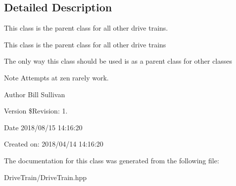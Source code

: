 \subsection{Detailed Description}
This class is the parent class for all other drive trains. 

This class is the parent class for all other drive trains

The only way this class should be used is as a parent class for other classes

\begin{DoxyNote}{Note}
Attempts at zen rarely work.
\end{DoxyNote}
\begin{DoxyAuthor}{Author}
Bill Sullivan
\end{DoxyAuthor}
\begin{DoxyVersion}{Version}
\$\+Revision\+: 1.
\end{DoxyVersion}
\begin{DoxyDate}{Date}
2018/08/15 14\+:16\+:20
\end{DoxyDate}
Created on\+: 2018/04/14 14\+:16\+:20 

The documentation for this class was generated from the following file\+:\begin{DoxyCompactItemize}
\item 
Drive\+Train/Drive\+Train.\+hpp\end{DoxyCompactItemize}
